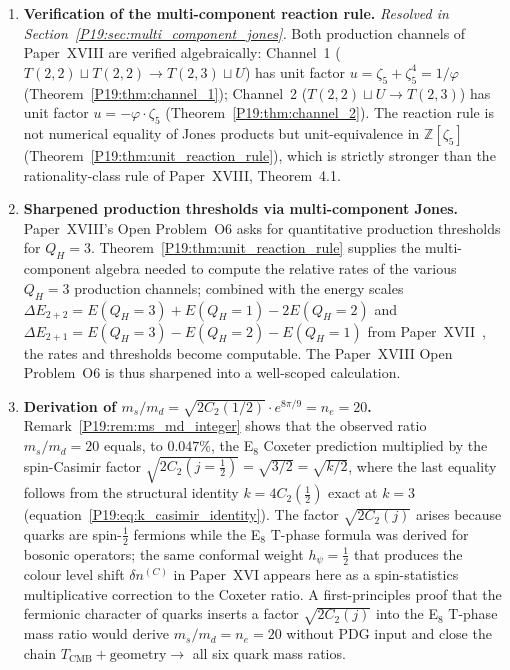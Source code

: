\documentclass[11pt,a4paper]{article}
\theoremstyle{definition}\newtheorem{definition}[theorem]{Definition}
\theoremstyle{remark}
\newcommand{\vp}{\varphi}
\newcommand{\QH}{Q_H}
\begin{document}
\begin{enumerate}[leftmargin=2em,label=\textbf{O\arabic*.}]
\item \textbf{Verification of the multi-component reaction rule.}
\emph{Resolved in Section~\ref{P19:sec:multi_component_jones}.}
Both production channels of Paper~XVIII are verified algebraically:
Channel~1 ($T(2,2)\sqcup T(2,2)\to T(2,3)\sqcup U$) has unit
factor $u=\zeta_5+\zeta_5^4=1/\vp$
(Theorem~\ref{P19:thm:channel_1}); Channel~2
($T(2,2)\sqcup U\to T(2,3)$) has unit factor
$u=-\vp\cdot\zeta_5$ (Theorem~\ref{P19:thm:channel_2}).
The reaction rule is not numerical equality of Jones products
but unit-equivalence in $\mathbb{Z}[\zeta_5]$
(Theorem~\ref{P19:thm:unit_reaction_rule}), which is strictly stronger
than the rationality-class rule of Paper~XVIII, Theorem~4.1. %

\item \textbf{Sharpened production thresholds via multi-component Jones.}
Paper~XVIII's Open Problem~O6 asks for quantitative production
thresholds for $\QH=3$.  Theorem~\ref{P19:thm:unit_reaction_rule}
supplies the multi-component algebra needed to compute the
relative rates of the various $\QH=3$ production channels;
combined with the energy scales
$\Delta E_{2+2}=E(\QH=3)+E(\QH=1)-2E(\QH=2)$ and
$\Delta E_{2+1}=E(\QH=3)-E(\QH=2)-E(\QH=1)$
from Paper~XVII~\cite{Paper17}, the rates and thresholds become
computable.  The Paper~XVIII Open Problem~O6 is thus sharpened
into a well-scoped calculation.

\item \textbf{Derivation of $m_s/m_d = \sqrt{2C_2(1/2)}\cdot e^{8\pi/9} = n_e = 20$.}
Remark~\ref{P19:rem:ms_md_integer} shows that the observed ratio
$m_s/m_d=20$ equals, to $0.047\%$, the E$_8$ Coxeter prediction
multiplied by the spin-Casimir factor $\sqrt{2C_2(j=\tfrac12)}
=\sqrt{3/2}=\sqrt{k/2}$, where the last equality follows from
the structural identity $k=4C_2(\tfrac12)$ exact at $k=3$
(equation~\eqref{P19:eq:k_casimir_identity}).  The factor
$\sqrt{2C_2(j)}$ arises because quarks are spin-$\tfrac12$
fermions while the E$_8$ T-phase formula was derived for bosonic
operators; the same conformal weight $h_\psi=\tfrac12$ that
produces the colour level shift $\delta n^{(C)}$ in Paper~XVI
appears here as a spin-statistics multiplicative correction to
the Coxeter ratio.  A first-principles proof that the fermionic
character of quarks inserts a factor $\sqrt{2C_2(j)}$ into
the E$_8$ T-phase mass ratio would derive $m_s/m_d=n_e=20$
without PDG input and close the chain
$T_{\mathrm{CMB}}+\mathrm{geometry}\to$ all six quark mass ratios.


\end{enumerate}
\end{document}
